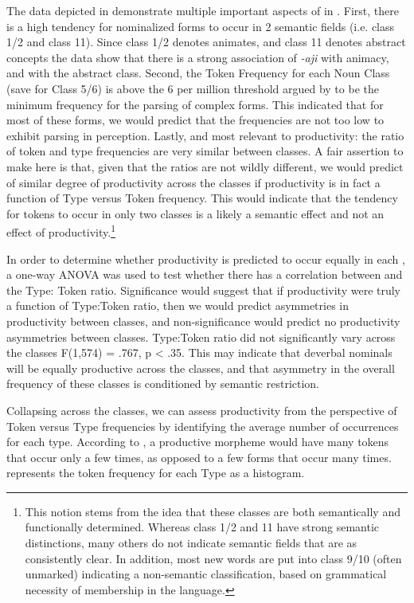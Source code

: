 \documentclass[output=paper,modfonts]{langscibook}
\begin{document}
The data depicted in  demonstrate multiple important aspects of   in . First, there is a high tendency for nominalized forms to occur in 2 semantic fields (i.e. class 1/2 and class 11). Since class 1/2 denotes animates, and class 11 denotes abstract concepts the data show that there is a strong association of \textit{-aji} with animacy, and with the abstract class. Second, the Token Frequency for each Noun Class (save for Class 5/6) is above the 6 per million threshold argued by \citet{Alegre1999} to be the minimum frequency for the parsing of complex forms. This indicated that for most of these forms, we would predict that the frequencies are not too low to exhibit parsing in perception. Lastly, and most relevant to productivity: the ratio of token and type frequencies are very similar between  classes. A fair assertion to make here is that, given that the ratios are not wildly different, we would predict of similar degree of productivity across the classes if productivity is in fact a function of Type versus Token frequency. This would indicate that the tendency for tokens to occur in only two classes is a likely a semantic effect and not an effect of productivity.{}\footnote{This notion stems from the idea that these  classes are both semantically and functionally determined. Whereas class 1/2 and 11 have strong semantic distinctions, many others do not indicate semantic fields that are as consistently clear. In addition, most new words are put into class 9/10 (often unmarked) indicating a non-semantic classification, based on grammatical necessity of  membership in the language.} 

In order to determine whether productivity is predicted to occur equally in each , a one-way ANOVA was used to test whether there has a correlation between  and the Type: Token ratio. Significance would suggest that if productivity were truly a function of Type:Token ratio, then we would predict asymmetries in productivity between  classes, and non-significance would predict no productivity asymmetries between  classes. Type:Token ratio did not significantly vary across the  classes F(1,574) = .767, p < .35. This may indicate that  deverbal nominals will be equally productive across the  classes, and that asymmetry in the overall frequency of these classes is conditioned by semantic restriction.

Collapsing across the classes, we can assess productivity from the perspective of Token versus Type frequencies by identifying the average number of occurrences for each type. According to \citeauthor{Bybee1995}, a productive morpheme would have many tokens that occur only a few times, as opposed to a few forms that occur many times.  represents the token frequency for each Type as a histogram.
\end{document}
